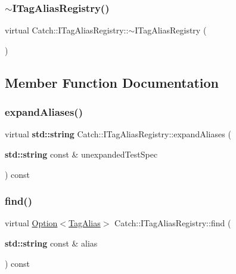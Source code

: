 \subsubsection{\texorpdfstring{$\sim$\+I\+Tag\+Alias\+Registry()}{~ITagAliasRegistry()}}
{\footnotesize\ttfamily virtual Catch\+::\+I\+Tag\+Alias\+Registry\+::$\sim$\+I\+Tag\+Alias\+Registry (\begin{DoxyParamCaption}{ }\end{DoxyParamCaption})\hspace{0.3cm}{\ttfamily [virtual]}}



\subsection{Member Function Documentation}
\mbox{\label{struct_catch_1_1_i_tag_alias_registry_ae729a7532faf7466db1a157ce0395170}} 
\subsubsection{\texorpdfstring{expand\+Aliases()}{expandAliases()}}
{\footnotesize\ttfamily virtual \textbf{ std\+::string} Catch\+::\+I\+Tag\+Alias\+Registry\+::expand\+Aliases (\begin{DoxyParamCaption}\item[{\textbf{ std\+::string} const \&}]{unexpanded\+Test\+Spec }\end{DoxyParamCaption}) const\hspace{0.3cm}{\ttfamily [pure virtual]}}

\mbox{\label{struct_catch_1_1_i_tag_alias_registry_a7d2fba4d39cfcc62c2695fcde4f989c3}} 
\subsubsection{\texorpdfstring{find()}{find()}}
{\footnotesize\ttfamily virtual \hyperlink{class_catch_1_1_option}{Option}$<$\hyperlink{struct_catch_1_1_tag_alias}{Tag\+Alias}$>$ Catch\+::\+I\+Tag\+Alias\+Registry\+::find (\begin{DoxyParamCaption}\item[{\textbf{ std\+::string} const \&}]{alias }\end{DoxyParamCaption}) const\hspace{0.3cm}{\ttfamily [pure virtual]}}

